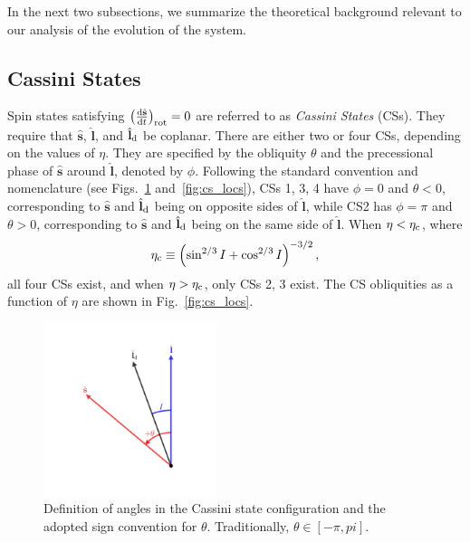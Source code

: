 \documentclass[
        fleqn,
        usenatbib,
    ]{mnras}
\newcommand*{\rd}[2]{\frac{\mathrm{d}#1}{\mathrm{d}#2}}
\newcommand*{\bm}[1]{\boldsymbol{\mathbf{#1}}}
\newcommand*{\uv}[1]{\hat{\bm{#1}}}
\newcommand*{\p}[1]{\left(#1\right)}
\begin{document}
In the next two subsections, we summarize the theoretical background relevant to
our analysis of the evolution of the system.

\subsection{Cassini States}\label{ss:cs}

Spin states satisfying $\p{\rd{\uv{s}}{t}}_{\rm rot} = 0$ are referred to as
\emph{Cassini States} (CSs). They require that $\uv{s}$, $\uv{l}$, and
$\uv{l}_{\rm d}$ be coplanar. There are either two or four CSs, depending
on the values of $\eta$. They are specified by the obliquity $\theta$ and the
precessional phase of $\uv{s}$ around $\uv{l}$, denoted by $\phi$. Following
the standard convention and nomenclature (see Figs.~\ref{fig:cs_vecs}
and~\ref{fig:cs_locs}), CSs 1, 3, 4 have $\phi = 0$ and $\theta < 0$,
corresponding to $\uv{s}$ and $\uv{l}_{\rm d}$ being on opposite sides of
$\uv{l}$, while CS2 has $\phi = \pi$ and $\theta > 0$, corresponding to $\uv{s}$
and $\uv{l}_{\rm d}$ being on the same side of $\uv{l}$. When $\eta < \eta_{\rm
c}$, where
\begin{equation}
    \eta_{\rm c} \equiv \p{\sin^{2/3}I + \cos^{2/3}I}^{-3/2},\label{eq:etac}
\end{equation}
all four CSs exist, and when $\eta > \eta_{\rm c}$, only CSs 2, 3 exist. The CS
obliquities as a function of $\eta$ are shown in Fig.~\ref{fig:cs_locs}.
\begin{figure}
    \includegraphics[width=0.45\textwidth]{plots_diskdisp/2_3vec.png}
    \caption{Definition of angles in the Cassini state configuration and the
    adopted sign convention for $\theta$. Traditionally, $\theta \in [-\pi,
    pi]$.}\label{fig:cs_vecs}
\end{figure}
\end{document}
